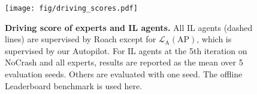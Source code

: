%
%
%

\begin{figure}[t]
	\centering
	\texttt{[image: fig/driving\_scores.pdf]}
	\vspace{-1ex}
	\caption{\textbf{Driving score of experts and IL agents.} 
		All IL agents (dashed lines) are supervised by Roach except for $\mathcal{L}_\text{A}(\text{AP})$, which is supervised by our Autopilot. 
		For IL agents at the 5th iteration on NoCrash and all experts, results are reported as the mean over 5 evaluation seeds. 
		Others are evaluated with one seed. 
		The offline Leaderboard benchmark is used here.}
	\vspace{-1.5ex}
	\label{fig:score_eu_lb_tt_tn}
\end{figure}


